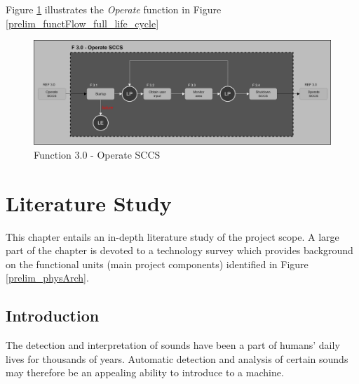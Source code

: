 \documentclass[a4paper,12pt]{article}
\numberwithin{equation}{section}
\numberwithin{figure}{section}
\numberwithin{table}{section}
\begin{document}
Figure \ref{prelim_functFlow_F3_operate} illustrates the \textit{Operate} function in Figure \ref{prelim_functFlow_full_life_cycle}

\begin{figure}[h!]
    \centering %
    \includegraphics[padding=1ex,width=1.0\textwidth,frame]{img/prelim_functFlow_F3_operate.png}
    \caption{Function 3.0 - Operate SCCS}
    \label{prelim_functFlow_F3_operate}
\end{figure}



























\newpage
\section{Literature Study}

This chapter entails an in-depth literature study of the project scope. A large part of the chapter is devoted to a technology survey which provides background on the functional units (main project components) identified in Figure \ref{prelim_physArch}.

\subsection{Introduction}

The detection and interpretation of sounds have been a part of humans' daily lives for thousands of years. Automatic detection and analysis of certain sounds may therefore be an appealing ability to introduce to a machine.
\end{document}
